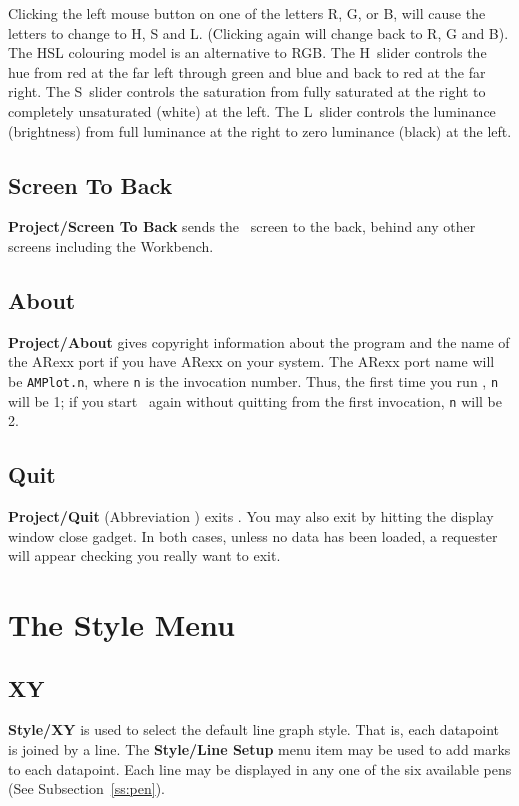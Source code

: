 Clicking the left mouse button on one of the letters R, G, or B, will cause the 
letters to change to H, S and L. (Clicking again will change back to R, G and B). 
The HSL colouring model is an alternative to RGB. The H~slider controls the hue from 
red at the far left through green and blue and back to red at the far right. The 
S~slider controls the saturation from fully saturated at the right to completely 
unsaturated (white) at the left. The L~slider controls the luminance (brightness) 
from full luminance at the right to zero luminance (black) at the left.

\subsection{Screen To Back}
{\bf Project/Screen To Back} sends the \amplot\ screen to the back, behind any other 
screens including the Workbench.

\subsection{About}
{\bf Project/About} gives copyright information about the program and the name of the 
ARexx port if you have ARexx on your system. The ARexx port name will 
be {\tt AMPlot.n}, where {\tt n} is the invocation number. Thus, the first time 
you run \amplot, {\tt n} will be 1; if you start \amplot\ again without quitting 
from the first invocation, {\tt n} will be 2.

\subsection{Quit}
{\bf Project/Quit} (Abbreviation )  exits \amplot. 
You may also exit by hitting the display window close gadget.
In both cases, unless no data has been loaded, a requester will appear checking 
you really want to exit.


\section{The Style Menu}


\subsection{XY}
{\bf Style/XY}  is used to select the default 
line graph style. That is, each datapoint is joined by a line. 
The {\bf Style/Line Setup} menu item may be used to add marks to each 
datapoint. Each line may be displayed in any one of the six available pens (See 
Subsection~\ref{ss:pen}).


